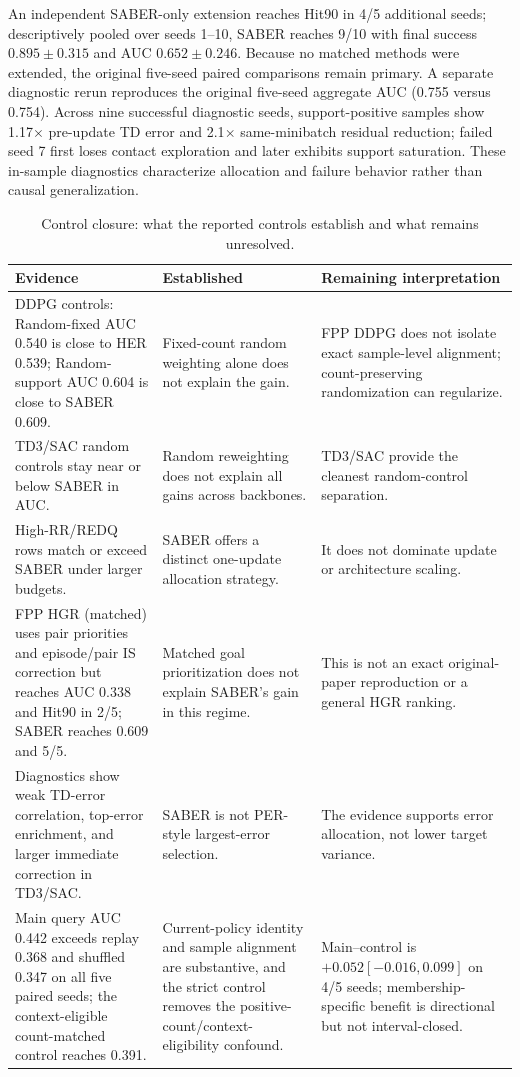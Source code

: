 \documentclass[letterpaper]{article}
\begin{document}
An independent SABER-only extension reaches Hit90 in 4/5 additional seeds; descriptively pooled over seeds 1--10, SABER reaches 9/10 with final success \(0.895\pm0.315\) and AUC \(0.652\pm0.246\). Because no matched methods were extended, the original five-seed paired comparisons remain primary. A separate diagnostic rerun reproduces the original five-seed aggregate AUC (0.755 versus 0.754). Across nine successful diagnostic seeds, support-positive samples show 1.17\(\times\) pre-update TD error and 2.1\(\times\) same-minibatch residual reduction; failed seed 7 first loses contact exploration and later exhibits support saturation. These in-sample diagnostics characterize allocation and failure behavior rather than causal generalization.

\begin{table}[t]
\centering
\small
\caption{Control closure: what the reported controls establish and what remains unresolved.}
\label{tab:closure-submission}
\begin{tabular}{p{}p{}p{}}
\toprule
Evidence & Established & Remaining interpretation \\
\midrule
DDPG controls: Random-fixed AUC 0.540 is close to HER 0.539; Random-support AUC 0.604 is close to SABER 0.609. &
Fixed-count random weighting alone does not explain the gain. &
FPP DDPG does not isolate exact sample-level alignment; count-preserving randomization can regularize. \\
\addlinespace
TD3/SAC random controls stay near or below SABER in AUC. &
Random reweighting does not explain all gains across backbones. &
TD3/SAC provide the cleanest random-control separation. \\
\addlinespace
High-RR/REDQ rows match or exceed SABER under larger budgets. &
SABER offers a distinct one-update allocation strategy. &
It does not dominate update or architecture scaling. \\
\addlinespace
FPP HGR (matched) uses pair priorities and episode/pair IS correction but reaches AUC 0.338 and Hit90 in 2/5; SABER reaches 0.609 and 5/5. &
Matched goal prioritization does not explain SABER's gain in this regime. &
This is not an exact original-paper reproduction or a general HGR ranking. \\
\addlinespace
Diagnostics show weak TD-error correlation, top-error enrichment, and larger immediate correction in TD3/SAC. &
SABER is not PER-style largest-error selection. &
The evidence supports error allocation, not lower target variance. \\
\addlinespace
Main query AUC 0.442 exceeds replay 0.368 and shuffled 0.347 on all five paired seeds; the context-eligible count-matched control reaches 0.391. &
Current-policy identity and sample alignment are substantive, and the strict control removes the positive-count/context-eligibility confound. &
Main--control is \(+0.052[-0.016,0.099]\) on 4/5 seeds; membership-specific benefit is directional but not interval-closed. \\
\bottomrule
\end{tabular}
\end{table}
\end{document}
